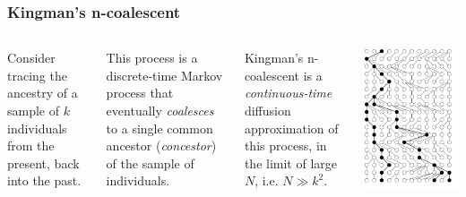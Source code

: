 \begin{frame}
  \frametitle{Kingman's n-coalescent}

\begin{columns}


Consider tracing the ancestry of a sample of $k$ individuals from the present,
back into the past.

This process is a discrete-time Markov process that eventually \emph{coalesces} to a
single common ancestor (\emph{concestor}) of the sample of individuals. 

Kingman's n-coalescent is a \emph{continuous-time}  diffusion approximation of this process, in the limit
of large $N$, i.e. $N \gg k^2$.

\includegraphics[scale=0.25]{../images/wfCoalescent3}

\end{columns}

\end{frame}

